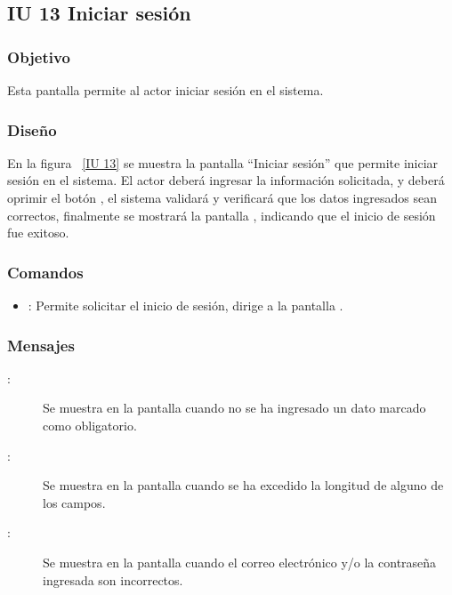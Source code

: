 \subsection{IU 13 Iniciar sesión}

\subsubsection{Objetivo}
	
	Esta pantalla permite al actor iniciar sesión en el sistema.

\subsubsection{Diseño}

    En la figura ~\ref{IU 13} se muestra la pantalla ``Iniciar sesión'' que permite iniciar sesión en el sistema. El actor deberá ingresar la información solicitada, y deberá oprimir el botón , el sistema validará y verificará que los datos ingresados sean correctos, finalmente se mostrará la pantalla , indicando que el inicio de sesión fue exitoso.


   

\subsubsection{Comandos}
\begin{itemize}
	\item {}: Permite solicitar el inicio de sesión, dirige a la pantalla .
\end{itemize}

\subsubsection{Mensajes}

	
\begin{description}
	\item[:] Se muestra en la pantalla  cuando no se ha ingresado un dato marcado como obligatorio.
	\item[:] Se muestra en la pantalla  cuando se ha excedido la longitud de alguno de los campos.
	\item[:] Se muestra en la pantalla  cuando el correo electrónico y/o la contraseña ingresada son incorrectos.
\end{description}
